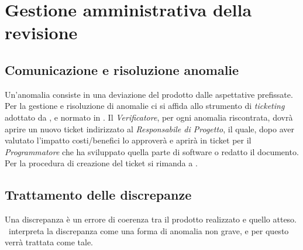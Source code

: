 \section{Gestione amministrativa della revisione}
\subsection{Comunicazione e risoluzione anomalie}
Un'anomalia consiste in una deviazione del prodotto dalle aspettative prefissate. Per la gestione e risoluzione di anomalie ci si affida allo strumento di
\textit{ticketing} adottato da \gruppo, e normato in \infoNDP. 
Il \textit{Verificatore}, per ogni anomalia riscontrata, dovrà aprire un nuovo ticket indirizzato al \textit{Responsabile di Progetto}, il quale, dopo aver valutato l'impatto costi/benefici lo approverà e aprirà in ticket per il \textit{Programmatore} che ha sviluppato quella parte di software o redatto il documento.
Per la procedura di creazione del ticket si rimanda a \infoNDP.
\subsection{Trattamento delle discrepanze}
Una discrepanza è un errore di coerenza tra il prodotto realizzato e quello atteso. \gruppo ~interpreta la discrepanza come una forma di anomalia non grave, e per questo verrà trattata come tale.
